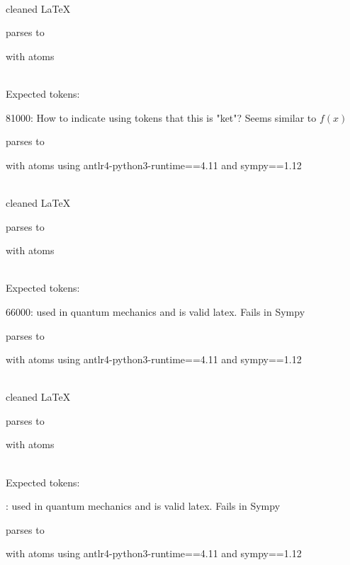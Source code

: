 \documentclass{article}
\begin{document}
\ \\
cleaned \LaTeX

parses to

with atoms


\ \\
Expected tokens:



\hrulefill

81000:
How to indicate using tokens that this is "ket"? Seems similar to $f(x)$

parses to

with atoms
using antlr4-python3-runtime==4.11 and sympy==1.12

\ \\
cleaned \LaTeX

parses to

with atoms


\ \\
Expected tokens:



\hrulefill


66000: 
used in quantum mechanics and is valid latex. Fails in Sympy

parses to

with atoms
using antlr4-python3-runtime==4.11 and sympy==1.12

\ \\
cleaned \LaTeX

parses to

with atoms


\ \\
Expected tokens:


: 
used in quantum mechanics and is valid latex. Fails in Sympy

parses to

with atoms
using antlr4-python3-runtime==4.11 and sympy==1.12
\end{document}
